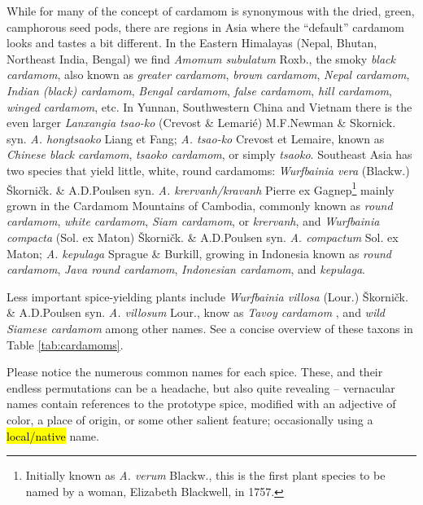 \documentclass[12pt]{article}
\begin{document}
While for many of the concept of cardamom is synonymous with the dried, green, camphorous seed pods, there are regions in Asia where the ``default'' cardamom looks and tastes a bit different. In the Eastern Himalayas (Nepal, Bhutan, Northeast India, Bengal) we find \textit{Amomum subulatum} Roxb., the smoky \textit{black cardamom}, also known as  \textit{greater cardamom}, \textit{brown cardamom}, \textit{Nepal cardamom}, \textit{Indian (black) cardamom}, \textit{Bengal cardamom}, \textit{false cardamom}, \textit{hill cardamom}, \textit{winged cardamom}, etc. In Yunnan, Southwestern China and Vietnam there is the even larger \textit{Lanxangia tsao-ko} (Crevost \& Lemarié) M.F.Newman \& Skornick. syn. \textit{A. hongtsaoko} Liang et Fang; \textit{A. tsao-ko} Crevost et Lemaire, known as \textit{Chinese black cardamom}, \textit{tsaoko cardamom}, or simply \textit{tsaoko}. Southeast Asia has two species that yield little, white, round cardamoms: \textit{Wurfbainia vera} (Blackw.) Škorničk. \& A.D.Poulsen syn. \textit{A. krervanh/kravanh} Pierre ex Gagnep\footnote{Initially known as \textit{A. verum} Blackw., this is the first plant species to be named by a woman, Elizabeth Blackwell, in 1757.} mainly grown in the Cardamom Mountains of Cambodia, commonly known as \textit{round cardamom}, \textit{white cardamom}, \textit{Siam cardamom}, or \textit{krervanh}, and \textit{Wurfbainia compacta} (Sol. ex Maton) Škorničk. \& A.D.Poulsen syn. \textit{A. compactum} Sol. ex Maton; \textit{A. kepulaga} Sprague \& Burkill, growing in Indonesia known as \textit{round cardamom}, \textit{Java round cardamom}, \textit{Indonesian cardamom}, and \textit{kepulaga}. 

Less important spice-yielding plants include \textit{Wurfbainia villosa} (Lour.) Škorničk. \& A.D.Poulsen syn. \textit{A. villosum} Lour., know as \textit{Tavoy cardamom}
, and \textit{wild Siamese cardamom} among other names. See a concise overview of these taxons in Table \ref{tab:cardamoms}.

Please notice the numerous common names for each spice. These, and their endless permutations can be a headache, but also quite revealing -- vernacular names contain references to the prototype spice, modified with an adjective of color, a place of origin, or some other salient feature; occasionally using a \hl{local/native} name.


\end{document}
